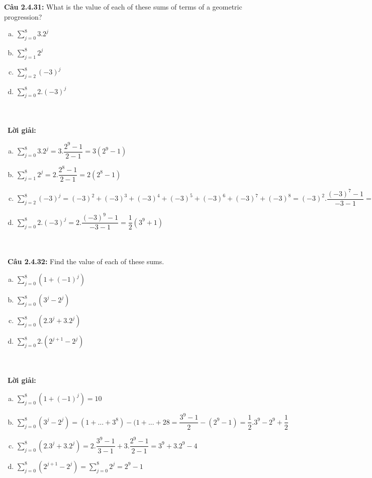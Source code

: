 \documentclass[a4paper]{article}
\begin{document}
\textbf{Câu 2.4.31: } What is the value of each of these sums of terms of a geometric progression?
\begin{enumerate}[a)]
\item $\sum_{j=0}^{8}3.2^{j}$
\item $\sum_{j=1}^{8}2^{j}$
\item $\sum_{j=2}^{8}(-3)^{j}$
\item $\sum_{j=0}^{8}2.(-3)^{j}$
\end{enumerate} \\\ \\\
\textbf{Lời giải:} \begin{enumerate}[a)]
\item $\sum_{j=0}^{8}3.2^{j}=3.\dfrac{2^{9}-1}{2-1}=3(2^{9}-1)$
\item $\sum_{j=1}^{8}2^{j}=2.\dfrac{2^{8}-1}{2-1}=2(2^{8}-1)$
\item $\sum_{j=2}^{8}(-3)^{j}=(-3)^{2}+(-3)^{3}+(-3)^{4}+(-3)^{5}+(-3)^{6}+(-3)^{7}+(-3)^{8}=(-3)^{2}.\dfrac{(-3)^{7}-1}{-3-1}=\dfrac{9}{4}(3^{7}+1)$
\item $\sum_{j=0}^{8}2.(-3)^{j}=2.\dfrac{(-3)^{9}-1}{-3-1}=\dfrac{1}{2}(3^{9}+1)$
\end{enumerate} \\\ \\\
\textbf{Câu 2.4.32: }  Find the value of each of these sums.
\begin{enumerate}[a)]
\item $\sum_{j=0}^{8}(1+(-1)^{j})$
\item $\sum_{j=0}^{8}(3^{j}-2^{j})$
\item $\sum_{j=0}^{8}(2.3^{j}+3.2^{j})$
\item $\sum_{j=0}^{8}2.(2^{j+1}-2^{j})$
\end{enumerate}
 \\\ \\\
\textbf{Lời giải:} \begin{enumerate}[a)]
\item $\sum_{j=0}^{8}(1+(-1)^{j})=10$
\item $\sum_{j=0}^{8}(3^{j}-2^{j})=(1+...+3^{8})-(1+...+2{8}=\dfrac{3^{9}-1}{2}-(2^{9}-1)=\dfrac{1}{2}.3^{9}-2^{9}+\dfrac{1}{2}$
\item $\sum_{j=0}^{8}(2.3^{j}+3.2^{j})=2.\dfrac{3^{9}-1}{3-1}+3.\dfrac{2^{9}-1}{2-1}=3^{9}+3.2^{9}-4$
\item $\sum_{j=0}^{8}(2^{j+1}-2^{j})=\sum_{j=0}^{8}2^{j}=2^{9}-1$
\end{enumerate} \\\ \\\
\end{document}
